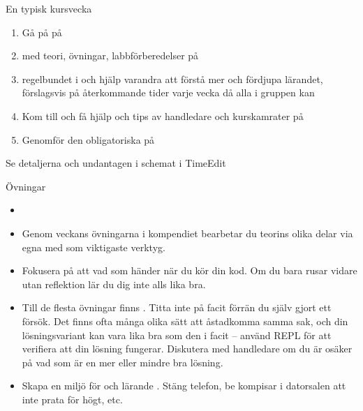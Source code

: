 \fi %

\begin{Slide}{En typisk kursvecka}
\begin{enumerate}
\item Gå på  på 
\item {}  med teori, övningar, labbförberedelser på  
\item {} regelbundet i  och hjälp varandra att förstå mer och fördjupa lärandet, förslagsvis på återkommande tider varje vecka då alla i gruppen kan
\item Kom till  och få hjälp och tips av handledare och kurskamrater på 
\item Genomför den obligatoriska  på 
\end{enumerate}
Se detaljerna och undantagen i schemat i TimeEdit
\end{Slide}

\ifkompendium\else  %
\begin{SlideExtra}{Övningar}\SlideFontSmall
\begin{itemize}
  \item {}

\item Genom veckans övningarna i kompendiet bearbetar du teorins olika delar via egna  med  som viktigaste verktyg.

\item Fokusera på att  vad som händer när du kör din kod. Om du bara rusar vidare utan reflektion lär du dig inte alls lika bra.

\item Till de flesta övningar finns . Titta inte på facit förrän du själv gjort ett försök. Det finns ofta många olika sätt att åstadkomma samma sak, och din lösningsvariant kan vara lika bra som den i facit -- använd REPL för att verifiera att din lösning fungerar. Diskutera med handledare om du är osäker på vad som är en mer eller mindre bra lösning.

\item Skapa en miljö för  och lärande . Stäng telefon, be kompisar i datorsalen att inte prata för högt, etc.
\end{itemize}
\end{SlideExtra}

